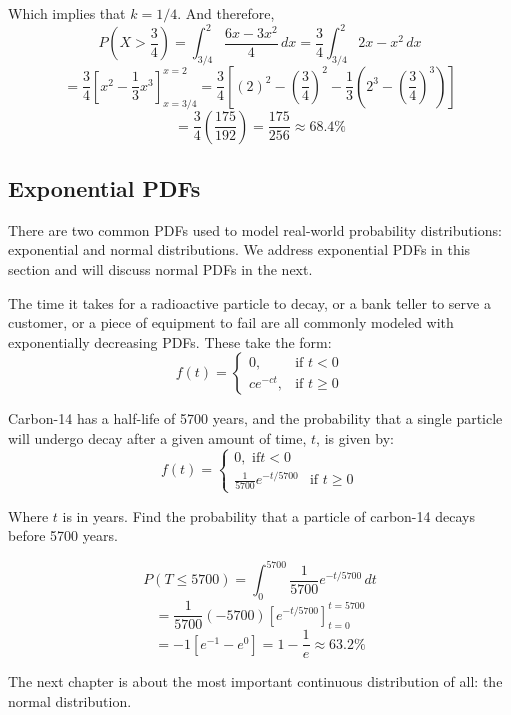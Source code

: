 \begin{Answer}[ref = int_pdf]
\begin{enumerate}
    Which implies that $k = 1/4$. And therefore,
    $$P(X > \frac{3}{4} ) = \int_{3/4}^2 \frac{6x - 3x^2}{4}\,dx = \frac{3}{4} 
    \int_{3/4}^2 2x - x^2\,dx$$
    $$= \frac{3}{4} \left[ x^2 - \frac{1}{3}x^3 \right]_{x = 3/4}^{x = 2} = 
    \frac{3}{4} \left[ (2)^2 - \left( \frac{3}{4} \right)^2 - \frac{1}{3} 
    \left( 2^3 - \left( \frac{3}{4} \right)^3 \right) \right]$$
    $$= \frac{3}{4} \left( \frac{175}{192} \right) = \frac{175}{256} \approx 
    68.4\%$$
\end{enumerate}
\end{Answer}

\subsection{Exponential PDFs}
There are two common PDFs used to model real-world probability distributions: 
exponential and normal distributions. We address exponential PDFs in this 
section and will discuss normal PDFs in the next. 

The time it takes for a radioactive particle to decay, or a bank teller to 
serve a customer, or a piece of equipment to fail are all commonly modeled 
with exponentially decreasing PDFs. These take the form:
$$f(t) = 
\begin{cases}
0,&\text{if }t<0\\
ce^{-ct},&\text{if }t \geq 0
\end{cases}$$

\begin{Worked}
\begin{Problem}
Carbon-14 has a half-life of 5700 years, and the probability 
that a single particle will undergo decay after a given amount of time, $t$, 
is given by:
$$f(t) = 
\begin{cases}
    0,\text{ if}t<0\\
    \frac{1}{5700}e^{-t/5700}&\text{if }t \geq 0
\end{cases}$$

Where $t$ is in years. Find the probability that a particle of carbon-14 
decays before 5700 years. 
\end{Problem}
\begin{Solution}
$$P(T \leq 5700) = \int_0^{5700} \frac{1}{5700} e^{-t/5700}\,dt$$
$$= \frac{1}{5700} \left(-5700 \right) \left[e^{-t/5700} \right]_{t = 0}^{
t = 5700}$$
$$= -1 \left[ e^{-1} - e^{0} \right] = 1 - \frac{1}{e} \approx 63.2\%$$
\end{Solution}
\end{Worked}

The next chapter is about the most important continuous distribution of all: the normal distribution.
